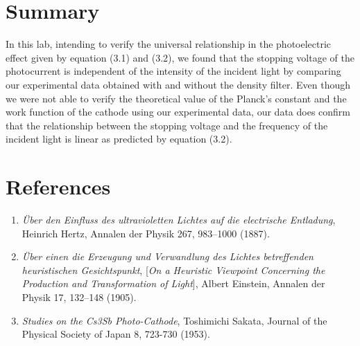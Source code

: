 \documentclass[11pt]{book}
\theoremstyle{break}
\theoremstyle{break}
\begin{document}
\hfill\break
\hfill\break
\section{Summary}
In this lab, intending to verify the universal relationship in the photoelectric effect given by equation (3.1) and (3.2), we found that the stopping voltage of the photocurrent is independent of the intensity of the incident light by comparing our experimental data obtained with and without the density filter. Even though we were not able to verify the theoretical value of the Planck's constant and the work function of the cathode using our experimental data, our data does confirm that the relationship between the stopping voltage and the frequency of the incident light is linear as predicted by equation (3.2). \\
\hfill\break
\hfill\break

\section{References}
\begin{enumerate}
\item \textit{Über den Einfluss des ultravioletten Lichtes auf die electrische Entladung},  Heinrich  Hertz, Annalen der Physik 267, 983–1000 (1887). 
\item \textit{Über  einen  die  Erzeugung  und  Verwandlung  des  Lichtes  betreffenden  heuristischen Gesichtspunkt}, [\textit{On a Heuristic Viewpoint Concerning the Production and Transformation of Light}], Albert Einstein, Annalen der Physik 17, 132–148 (1905).
\item \textit{Studies on the Cs3Sb Photo-Cathode}, Toshimichi Sakata, Journal of the Physical Society of Japan 8, 723-730 (1953). 
\end{enumerate}


\newpage
\end{document}
